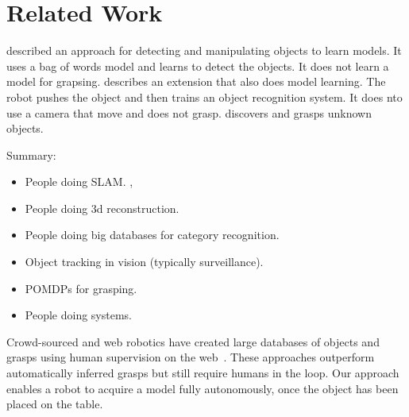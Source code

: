 \documentclass[conference]{IEEEtran}
\begin{document}



\section{Related Work}

\citet{ude12} described an approach for detecting and manipulating
objects to learn models.  It uses a bag of words model and learns to
detect the objects.  It does not learn a model for grapsing.
\citet{schiebener13} describes an extension that also does model
learning.  The robot pushes the object and then trains an object
recognition system.  It does nto use a camera that move and does not
grasp.
\citet{schiebener12} discovers and grasps unknown objects.

Summary: 
\begin{itemize}
\item People doing SLAM.  \citet{wang07, gallagher09}, 
\item People doing 3d reconstruction.   \citet{krainin11, banta00}
\item People doing big databases for category recognition.  \citet{kent14a, kent14, lai11a, goldfeder09}
\item Object tracking in vision (typically surveillance).
\item POMDPs for grasping.  \citet{platt11, hsiao10}
\item People doing systems.  \citet{hudson12, ciocarlie14}
\end{itemize}




Crowd-sourced and web robotics have created large databases of objects
and grasps using human supervision on the web~\citep{kent14a, kent14}.
These approaches outperform automatically inferred grasps but still
require humans in the loop.  Our approach enables a robot to acquire a
model fully autonomously, once the object has been placed on the
table.
\end{document}

